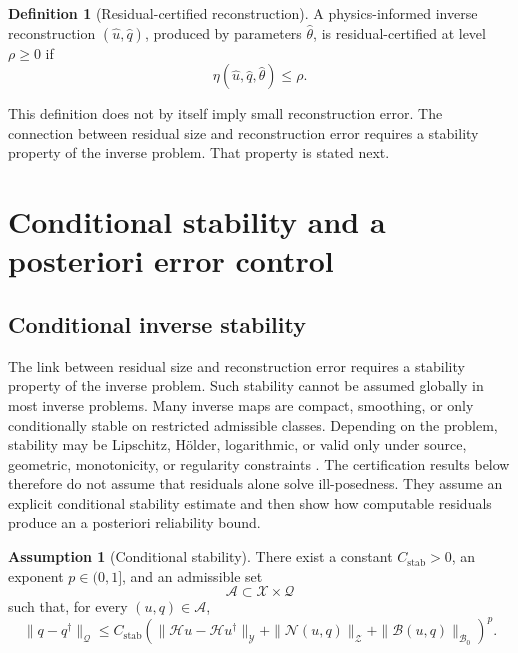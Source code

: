 \documentclass{article}
\numberwithin{equation}{section}
\theoremstyle{definition}
\newtheorem{assumption}{Assumption}
\newtheorem{definition}{Definition}
\begin{document}
\begin{definition}[Residual-certified reconstruction]
\label{def:residual-certified}
A physics-informed inverse reconstruction \((\widehat u,\widehat q)\), produced by parameters \(\widehat\theta\), is residual-certified at level \(\rho\ge0\) if
\begin{equation}
\eta(\widehat u,\widehat q,\widehat\theta)\le \rho.
\label{eq:residual-certified}
\end{equation}
\end{definition}

This definition does not by itself imply small reconstruction error. The connection between residual size and reconstruction error requires a stability property of the inverse problem. That property is stated next.

\section{Conditional stability and a posteriori error control}
\label{sec:conditional-stability}

\subsection{Conditional inverse stability}

The link between residual size and reconstruction error requires a stability property of the inverse problem. Such stability cannot be assumed globally in most inverse problems. Many inverse maps are compact, smoothing, or only conditionally stable on restricted admissible classes. Depending on the problem, stability may be Lipschitz, H\"older, logarithmic, or valid only under source, geometric, monotonicity, or regularity constraints \cite{EnglHankeNeubauer1996,Isakov2006,Yamamoto2009,Kirsch2011}. The certification results below therefore do not assume that residuals alone solve ill-posedness. They assume an explicit conditional stability estimate and then show how computable residuals produce an a posteriori reliability bound.

\begin{assumption}[Conditional stability]
\label{ass:conditional-stability}
There exist a constant \(C_{\mathrm{stab}}>0\), an exponent \(p\in(0,1]\), and an admissible set
\[
\mathcal A\subset \mathcal X\times\mathcal Q
\]
such that, for every \((u,q)\in\mathcal A\),
\begin{equation}
\|q-q^\dagger\|_{\mathcal Q}
\le
C_{\mathrm{stab}}
\left(
\|\mathcal H u-\mathcal H u^\dagger\|_{\mathcal Y}
+
\|\mathcal N(u,q)\|_{\mathcal Z}
+
\|\mathcal B(u,q)\|_{\mathcal B_0}
\right)^p .
\label{eq:conditional-stability}
\end{equation}
\end{assumption}
\end{document}
